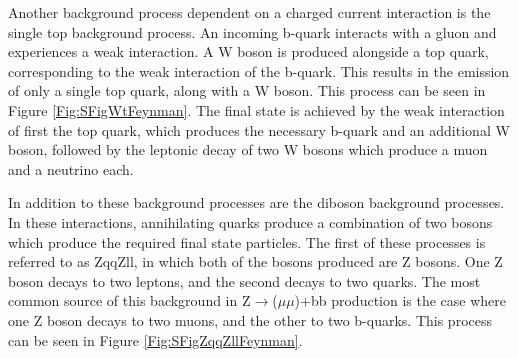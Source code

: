 \documentclass[12pt,a4paper,epsf,portrait,times,epsfig]{report}
\begin{document}

		
		Another background process dependent on a charged current interaction is the single top background process. An incoming b-quark interacts with a gluon and experiences a weak interaction. A W boson is produced alongside a top quark, corresponding to the weak interaction of the b-quark. This results in the emission of only a single top quark, along with a W boson. This process can be seen in Figure \ref{Fig:SFigWtFeynman}. The final state is achieved by the weak interaction of first the top quark, which produces the necessary b-quark and an additional W boson, followed by the leptonic decay of two W bosons which produce a muon and a neutrino each. \par
		
		In addition to these background processes are the diboson background processes. In these interactions, annihilating quarks produce a combination of two bosons which produce	the required final state particles. The first of these processes is referred to as ZqqZll, in which both of the bosons produced are Z bosons. One Z boson decays to two leptons, and the second decays to two quarks. The most common source of this background in Z$\rightarrow$($\mu\mu$)+bb production is the case where one Z boson decays to two muons, and the other to two b-quarks. This	process can be seen in Figure \ref{Fig:SFigZqqZllFeynman}. \par
		
\end{document}
